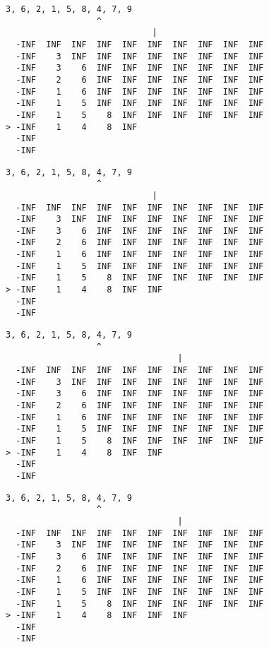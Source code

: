 { \begin{verbatim}
3, 6, 2, 1, 5, 8, 4, 7, 9
                  ^
                             |
  -INF  INF  INF  INF  INF  INF  INF  INF  INF  INF
  -INF    3  INF  INF  INF  INF  INF  INF  INF  INF
  -INF    3    6  INF  INF  INF  INF  INF  INF  INF
  -INF    2    6  INF  INF  INF  INF  INF  INF  INF
  -INF    1    6  INF  INF  INF  INF  INF  INF  INF
  -INF    1    5  INF  INF  INF  INF  INF  INF  INF
  -INF    1    5    8  INF  INF  INF  INF  INF  INF
> -INF    1    4    8  INF                         
  -INF                                             
  -INF                                             
\end{verbatim} }

{ \begin{verbatim}
3, 6, 2, 1, 5, 8, 4, 7, 9
                  ^
                             |
  -INF  INF  INF  INF  INF  INF  INF  INF  INF  INF
  -INF    3  INF  INF  INF  INF  INF  INF  INF  INF
  -INF    3    6  INF  INF  INF  INF  INF  INF  INF
  -INF    2    6  INF  INF  INF  INF  INF  INF  INF
  -INF    1    6  INF  INF  INF  INF  INF  INF  INF
  -INF    1    5  INF  INF  INF  INF  INF  INF  INF
  -INF    1    5    8  INF  INF  INF  INF  INF  INF
> -INF    1    4    8  INF  INF                    
  -INF                                             
  -INF                                             
\end{verbatim} }

{ \begin{verbatim}
3, 6, 2, 1, 5, 8, 4, 7, 9
                  ^
                                  |
  -INF  INF  INF  INF  INF  INF  INF  INF  INF  INF
  -INF    3  INF  INF  INF  INF  INF  INF  INF  INF
  -INF    3    6  INF  INF  INF  INF  INF  INF  INF
  -INF    2    6  INF  INF  INF  INF  INF  INF  INF
  -INF    1    6  INF  INF  INF  INF  INF  INF  INF
  -INF    1    5  INF  INF  INF  INF  INF  INF  INF
  -INF    1    5    8  INF  INF  INF  INF  INF  INF
> -INF    1    4    8  INF  INF                    
  -INF                                             
  -INF                                             
\end{verbatim} }

{ \begin{verbatim}
3, 6, 2, 1, 5, 8, 4, 7, 9
                  ^
                                  |
  -INF  INF  INF  INF  INF  INF  INF  INF  INF  INF
  -INF    3  INF  INF  INF  INF  INF  INF  INF  INF
  -INF    3    6  INF  INF  INF  INF  INF  INF  INF
  -INF    2    6  INF  INF  INF  INF  INF  INF  INF
  -INF    1    6  INF  INF  INF  INF  INF  INF  INF
  -INF    1    5  INF  INF  INF  INF  INF  INF  INF
  -INF    1    5    8  INF  INF  INF  INF  INF  INF
> -INF    1    4    8  INF  INF  INF               
  -INF                                             
  -INF                                             
\end{verbatim} }

